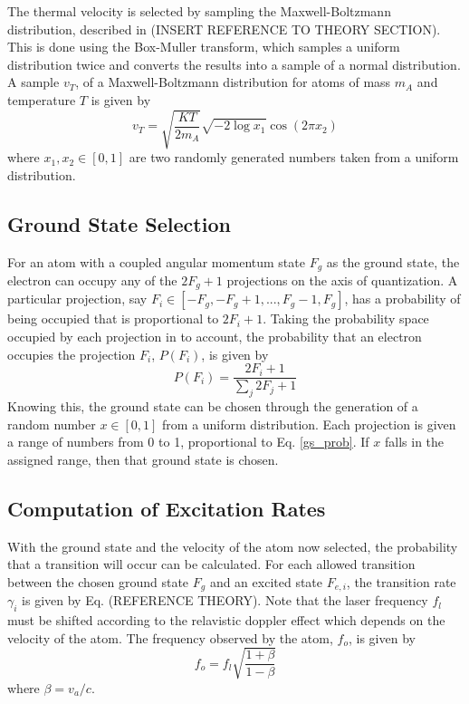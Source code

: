 The thermal velocity is selected by sampling the Maxwell-Boltzmann distribution, described in (INSERT REFERENCE TO THEORY SECTION). This is done using the Box-Muller transform, which samples a uniform distribution twice and converts the results into a sample of a normal distribution. A sample $v_T$, of a Maxwell-Boltzmann distribution for atoms of mass $m_A$ and temperature $T$ is given by
\begin{equation}
v_T = \sqrt{\frac{KT}{2m_A}}\sqrt{-2\log x_1}\cos (2\pi x_2)
\end{equation}
where $x_1,x_2 \in [0,1]$ are two randomly generated numbers taken from a uniform distribution.

\subsection{Ground State Selection}
For an atom with a coupled angular momentum state $F_g$ as the ground state, the electron can occupy any of the $2F_g+1$ projections on the axis of quantization. A particular projection, say $F_i \in [-F_g,-F_g+1,...,F_g-1,F_g]$, has a probability of being occupied that is proportional to $2F_i+1$. Taking the probability space occupied by each projection in to account, the probability that an electron occupies the projection $F_i$, $P(F_i)$, is given by
\begin{equation}
P(F_i) = \frac{2F_i+1}{\sum_j 2F_j+1}
\label{gs_prob}
\end{equation}
Knowing this, the ground state can be chosen through the generation of a random number $x \in [0,1]$ from a uniform distribution. Each projection is given a range of numbers from 0 to 1, proportional to Eq. \ref{gs_prob}. If $x$ falls in the assigned range, then that ground state is chosen. 

\subsection{Computation of Excitation Rates}
With the ground state and the velocity of the atom now selected, the probability that a transition will occur can be calculated. For each allowed transition between the chosen ground state $F_g$ and an excited state $F_{e,i}$, the transition rate $\gamma_i$ is given by Eq. (REFERENCE THEORY). Note that the laser frequency $f_l$ must be shifted according to the relavistic doppler effect which depends on the velocity of the atom. The frequency observed by the atom, $f_o$, is given by \cite{cmec}
\begin{equation}
f_o = f_l \sqrt{\frac{1+\beta}{1-\beta}}
\end{equation}
where $\beta = v_a/c$.

